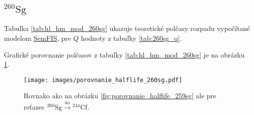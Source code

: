 \documentclass[12pt, oneside]{book}
\begin{document}
\subsection*{$^{260} \mathrm{Sg}$} 
\vspace{5mm}
Tabuľka  \ref{tab:hl_hm_mod_260sg} ukazuje teoretické polčasy rozpadu vypočítané modelom  \hyperref[sec:semfis]{SemFIS}, pre $Q$ hodnoty z tabuľky \ref{tab:260sg_q}.

\begin{table}[h!]
	\centering
	\caption{Porovnanie teoretických polčasov rozpadu reťazca $^{260} \mathrm{Sg} \xrightarrow{4 \alpha} {^{244} \mathrm{Cf}}$, určených podľa modelu z \cite{poe80} (upraveným v \cite{poe06}), pre $Q$ hodnoty určené z teoretických hmotnostných modelov podľa \ref{eq:q_ubytok}.}
	\label{tab:hl_hm_mod_260sg}
\end{table}

Grafické porovnanie polčasov z tabuľky \ref{tab:hl_hm_mod_260sg} je na obrázku \ref{fig:porovnanie_halflife_260sg}.

\begin{figure}[h!]
	\begin{center}
	\texttt{[image: images/porovnanie\_halflife\_260sg.pdf]}
	\caption{Rovnako ako na obrázku \ref{fig:porovnanie_halflife_259sg} ale pre reťazec $^{260} \mathrm{Sg} \xrightarrow{4 \alpha} {^{244} \mathrm{Cf}}$.}
	\label{fig:porovnanie_halflife_260sg}
    \end{center}
\end{figure}
\end{document}
